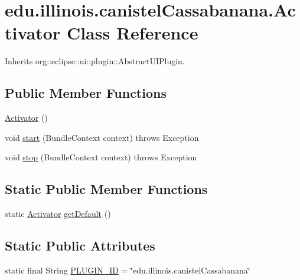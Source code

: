 \hypertarget{classedu_1_1illinois_1_1canistelCassabanana_1_1Activator}{
\section{edu.illinois.canistelCassabanana.Activator Class Reference}
\label{classedu_1_1illinois_1_1canistelCassabanana_1_1Activator}
}


Inherits org::eclipse::ui::plugin::AbstractUIPlugin.

\subsection*{Public Member Functions}
\begin{DoxyCompactItemize}
\item 
\hyperlink{classedu_1_1illinois_1_1canistelCassabanana_1_1Activator_a990926e662cddf912c3d4fdb777ae599}{Activator} ()
\item 
void \hyperlink{classedu_1_1illinois_1_1canistelCassabanana_1_1Activator_a06597d487406b212a28b150a9ca7bb71}{start} (BundleContext context)  throws Exception 
\item 
void \hyperlink{classedu_1_1illinois_1_1canistelCassabanana_1_1Activator_a2053d467c979bffb547b196009a7f516}{stop} (BundleContext context)  throws Exception 
\end{DoxyCompactItemize}
\subsection*{Static Public Member Functions}
\begin{DoxyCompactItemize}
\item 
static \hyperlink{classedu_1_1illinois_1_1canistelCassabanana_1_1Activator}{Activator} \hyperlink{classedu_1_1illinois_1_1canistelCassabanana_1_1Activator_a3d219b0ae6e10544052a9d1851956520}{getDefault} ()
\end{DoxyCompactItemize}
\subsection*{Static Public Attributes}
\begin{DoxyCompactItemize}
\item 
static final String \hyperlink{classedu_1_1illinois_1_1canistelCassabanana_1_1Activator_a520aad6c60b795ada42a2f316330f04e}{PLUGIN\_\-ID} = \char`\"{}edu.illinois.canistelCassabanana\char`\"{}
\end{DoxyCompactItemize}
